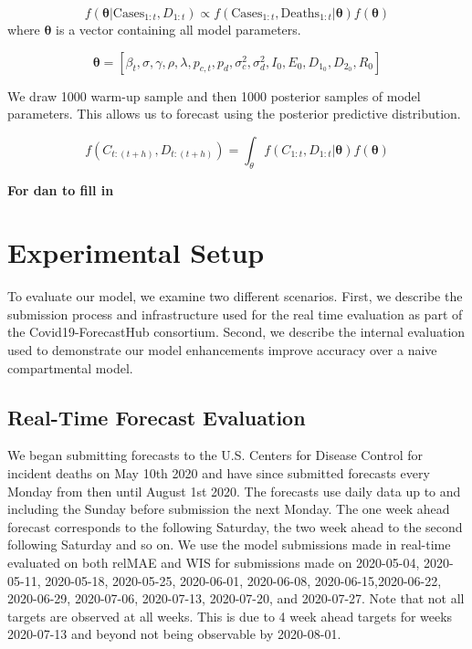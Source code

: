 \documentclass[11pt]{amsart}
\begin{document}
\begin{equation}
f(\bm{\theta} | \text{Cases}_{1:t},D_{1:t}) \propto f(\text{Cases}_{1:t},\text{Deaths}_{1:t} | \bm{\theta})f(\bm{\theta})
\end{equation}
where $\bm{\theta}$ is a vector containing all model parameters. 

\begin{equation}
\bm{\theta} =[\beta_{t} ,
\sigma ,
\gamma ,
\rho ,
\lambda ,
p_{c,t} ,
p_{d} ,
\sigma_c^2 ,
\sigma_d^2 ,
I_0 ,
E_0 ,
D_{1_0} ,
D_{2_0} ,
R_0 ]
\end{equation}

We draw 1000 warm-up sample and then 1000 posterior samples of model parameters. This allows us to forecast using the posterior predictive distribution.

\begin{equation}
f(C_{t:(t+h)}, D_{t:(t+h)}) =  \int_{\theta} f(C_{1:t},D_{1:t} | \bm{\theta})f(\bm{\theta})
\end{equation}

\textbf{For dan to fill in}
 \section{Experimental Setup}
 To evaluate our model, we examine two different scenarios. First, we describe the submission process and infrastructure used for the real time evaluation as part of the Covid19-ForecastHub consortium. Second, we describe the internal evaluation used to demonstrate our model enhancements improve accuracy over a naive compartmental model. 
 
 \subsection{Real-Time Forecast Evaluation}
We began submitting forecasts to the U.S. Centers for Disease Control for incident deaths on May 10th 2020 and have since submitted forecasts every Monday from then until August 1st 2020. The forecasts use daily data up to and including the Sunday before submission the next Monday. The one week ahead forecast corresponds to the following Saturday, the two week ahead to the second following Saturday and so on.  We use the model submissions made in real-time evaluated on both relMAE and WIS for submissions made on 2020-05-04, 2020-05-11, 2020-05-18, 2020-05-25, 2020-06-01, 2020-06-08, 2020-06-15,2020-06-22, 2020-06-29, 2020-07-06, 2020-07-13, 2020-07-20, and 2020-07-27. Note that not all targets are observed at all weeks. This is due to 4 week ahead targets for weeks 2020-07-13 and beyond not being observable by 2020-08-01.
 
\end{document}
